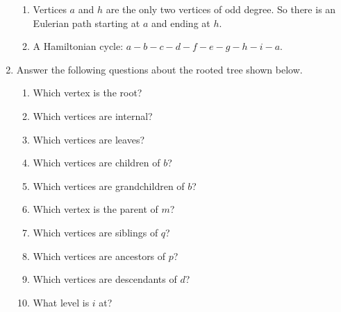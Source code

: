 \documentclass[11pt]{amsart}
\begin{document}
\begin{enumerate}
\begin{enumerate}
\item Vertices $a$ and $h$ are the only two vertices of odd degree. So there is an Eulerian path starting at $a$ and ending at $h$.\\[3pt]
  
\item A Hamiltonian cycle: $a-b-c-d-f-e-g-h-i-a.$ \\[5pt]

\end{enumerate}

\item  Answer the following questions about the rooted tree shown below.
 
 \vspace*{0.25cm}

  \begin{enumerate}
    \item Which vertex is the root?
    \item Which vertices are internal?
    \item Which vertices are leaves?
    \item Which vertices are children of $b$?
    \item Which vertices are grandchildren of $b$?
    \item Which vertex is the parent of $m$?
    \item Which vertices are siblings of $q$?
    \item Which vertices are ancestors of $p$? 
    \item  Which vertices are descendants of $d$?
    \item  What level is $i$ at?
  \end{enumerate}  




\end{enumerate}
\end{document}
